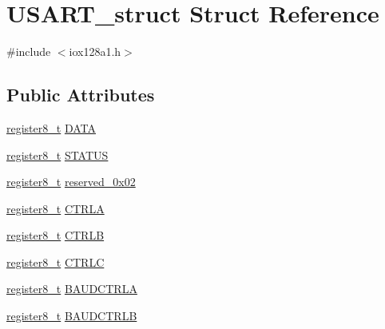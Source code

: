 \hypertarget{struct_u_s_a_r_t__struct}{
\section{USART\_\-struct Struct Reference}
\label{struct_u_s_a_r_t__struct}
}


{\ttfamily \#include $<$iox128a1.h$>$}

\subsection*{Public Attributes}
\begin{DoxyCompactItemize}
\item 
\hyperlink{iox128a1_8h_a6a0649252b392263406882923b04a9db}{register8\_\-t} \hyperlink{struct_u_s_a_r_t__struct_ab03b25929825b988cf5bc0287ee3ce74}{DATA}
\item 
\hyperlink{iox128a1_8h_a6a0649252b392263406882923b04a9db}{register8\_\-t} \hyperlink{struct_u_s_a_r_t__struct_a4f322c93a676dd8b8cec47b8439c0391}{STATUS}
\item 
\hyperlink{iox128a1_8h_a6a0649252b392263406882923b04a9db}{register8\_\-t} \hyperlink{struct_u_s_a_r_t__struct_ac808256f59ffae1393d381b975d5ed62}{reserved\_\-0x02}
\item 
\hyperlink{iox128a1_8h_a6a0649252b392263406882923b04a9db}{register8\_\-t} \hyperlink{struct_u_s_a_r_t__struct_ad84de636c48d65671de507feb013e6d9}{CTRLA}
\item 
\hyperlink{iox128a1_8h_a6a0649252b392263406882923b04a9db}{register8\_\-t} \hyperlink{struct_u_s_a_r_t__struct_aa3385a22a6299a55d51155f94943e2d0}{CTRLB}
\item 
\hyperlink{iox128a1_8h_a6a0649252b392263406882923b04a9db}{register8\_\-t} \hyperlink{struct_u_s_a_r_t__struct_aee1ddff9650e8f97f0c76c525a7ed20b}{CTRLC}
\item 
\hyperlink{iox128a1_8h_a6a0649252b392263406882923b04a9db}{register8\_\-t} \hyperlink{struct_u_s_a_r_t__struct_a156478eba14caaede2f2af05df07c220}{BAUDCTRLA}
\item 
\hyperlink{iox128a1_8h_a6a0649252b392263406882923b04a9db}{register8\_\-t} \hyperlink{struct_u_s_a_r_t__struct_abed00969aec542e5baf590eb9afbd6fa}{BAUDCTRLB}
\end{DoxyCompactItemize}


